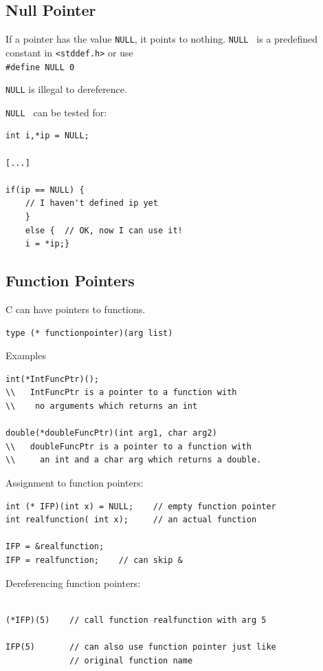 \documentclass{article}	%
\begin{document}
\subsection{Null Pointer}

If a pointer has the value {\tt NULL}, it points
to nothing.   {\tt NULL } is a predefined constant
in {\tt <stddef.h>} or use\\
{\tt \#define NULL 0}

{\tt NULL} is illegal to dereference.

{\tt NULL } can be tested for:

\begin{verbatim}
int i,*ip = NULL;

[...]

if(ip == NULL) {
    // I haven't defined ip yet
    }
    else {  // OK, now I can use it!
    i = *ip;}
\end{verbatim}


\subsection{Function Pointers}

C can have pointers to functions.

\begin{verbatim}
type (* functionpointer)(arg list)
\end{verbatim}
Examples
\begin{verbatim}
int(*IntFuncPtr)();
\\   IntFuncPtr is a pointer to a function with
\\    no arguments which returns an int

double(*doubleFuncPtr)(int arg1, char arg2)
\\   doubleFuncPtr is a pointer to a function with
\\     an int and a char arg which returns a double.
\end{verbatim}


Assignment to function pointers:

\begin{verbatim}
int (* IFP)(int x) = NULL;    // empty function pointer
int realfunction( int x);     // an actual function

IFP = &realfunction;
IFP = realfunction;    // can skip &
\end{verbatim}


Dereferencing function pointers:

\begin{verbatim}

(*IFP)(5)    // call function realfunction with arg 5

IFP(5)       // can also use function pointer just like
             // original function name
\end{verbatim}
\end{document}
